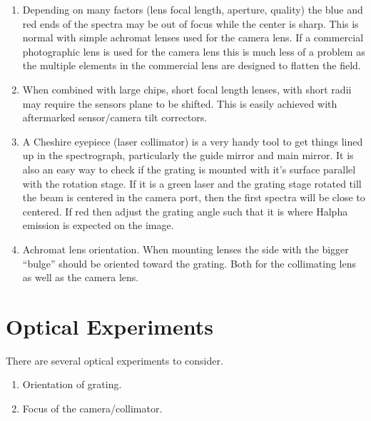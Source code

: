 \documentclass[letterpaper,10pt,english,openany,oneside]{sphinxmanual}
\begin{document}
\begin{enumerate}
\item {} 
\sphinxAtStartPar
Depending on many factors (lens focal length, aperture, quality)
the blue and red ends of the spectra may be out of focus while the
center is sharp. This is normal with simple achromat lenses used
for the camera lens. If a commercial photographic lens is used for
the camera lens this is much less of a problem as the multiple
elements in the commercial lens are designed to flatten the field.

\item {} 
\sphinxAtStartPar
When combined with large chips, short focal length lenses, with
short radii may require the sensors plane to be shifted. This is
easily achieved with after\sphinxhyphen{}marked sensor/camera tilt correctors.

\item {} 
\sphinxAtStartPar
A Cheshire eyepiece (laser collimator) is a very handy tool to get
things lined up in the spectrograph, particularly the guide mirror
and main mirror. It is also an easy way to check if the grating is
mounted with it’s surface parallel with the rotation stage. If it
is a green laser and the grating stage rotated till the beam is
centered in the camera port, then the first spectra will be close
to centered. If red then adjust the grating angle such that it is
where H\sphinxhyphen{}alpha emission is expected on the image.

\item {} 
\sphinxAtStartPar
Achromat lens orientation. When mounting lenses the side with the
bigger “bulge” should be oriented toward the grating. Both for the
collimating lens as well as the camera lens.

\end{enumerate}


\chapter{Optical Experiments}
\label{\detokenize{experiments:optical-experiments}}\label{\detokenize{experiments::doc}}
\sphinxAtStartPar
There are several optical experiments to consider.
\begin{enumerate}
%
\item {} 
\sphinxAtStartPar
Orientation of grating.

\item {} 
\sphinxAtStartPar
Focus of the camera/collimator.

\end{enumerate}
\end{document}
